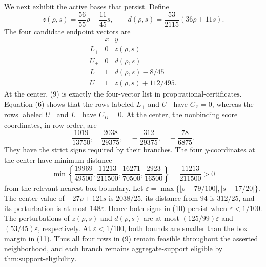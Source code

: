 We next exhibit the active bases that persist.  Define
\[
 z(\rho,s)=\frac{56}{55}\rho-\frac{11}{45}s,
 \qquad
 d(\rho,s)=\frac{53}{2115}(36\rho+11s). \tag{8}
\]
The four candidate endpoint vectors are
\[
 \begin{array}{c|cc}
 &x&y\\ \hline
 L_+&0&z(\rho,s)\\
 U_+&0&d(\rho,s)\\
 L_-&1&d(\rho,s)-8/45\\
 U_-&1&z(\rho,s)+112/495.
 \end{array} \tag{9}
\]
At the center, (9) is exactly the four-vector list in \(\text{prop:rational-certificates}\).  Equation (6) shows that the rows labeled \(L_+\) and \(U_-\) have \(C_Z=0\), whereas the rows labeled \(U_+\) and \(L_-\) have \(C_D=0\).  At the center, the nonbinding score coordinates, in row order, are
\[
 \frac{1019}{13750},\quad
 \frac{2038}{29375},\quad
 -\frac{312}{29375},\quad
 -\frac{78}{6875}. \tag{10}
\]
They have the strict signs required by their branches.  The four \(y\)-coordinates at the center have minimum distance
\[
 \min\left\{\frac{19969}{49500},\frac{11213}{211500},
              \frac{16271}{70500},\frac{2923}{16500}\right\}
 =\frac{11213}{211500}>0 \tag{11}
\]
from the relevant nearest box boundary.  Let \(\varepsilon=\max\{|\rho-79/100|,|s-17/20|\}\).  The center value of \(-27\rho+121s\) is \(2038/25\), its distance from \(94\) is \(312/25\), and its perturbation is at most \(148\varepsilon\).  Hence both signs in (10) persist when \(\varepsilon<1/100\).  The perturbations of \(z(\rho,s)\) and \(d(\rho,s)\) are at most \((125/99)\varepsilon\) and \((53/45)\varepsilon\), respectively.  At \(\varepsilon<1/100\), both bounds are smaller than the box margin in (11).  Thus all four rows in (9) remain feasible throughout the asserted neighborhood, and each branch remains aggregate-support eligible by \(\text{thm:support-eligibility}\).

